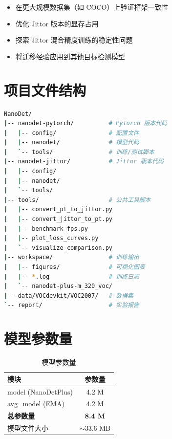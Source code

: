 \documentclass[12pt,a4paper]{article}
\begin{document}
\begin{itemize}
    \item 在更大规模数据集（如 COCO）上验证框架一致性
    \item 优化 Jittor 版本的显存占用
    \item 探索 Jittor 混合精度训练的稳定性问题
    \item 将迁移经验应用到其他目标检测模型
\end{itemize}

\appendix

\section{项目文件结构}

\begin{lstlisting}[language=bash,caption=项目目录结构]
NanoDet/
|-- nanodet-pytorch/          # PyTorch 版本代码
|   |-- config/               # 配置文件
|   |-- nanodet/              # 模型代码
|   `-- tools/                # 训练/测试脚本
|-- nanodet-jittor/           # Jittor 版本代码
|   |-- config/
|   |-- nanodet/
|   `-- tools/
|-- tools/                    # 公共工具脚本
|   |-- convert_pt_to_jittor.py
|   |-- convert_jittor_to_pt.py
|   |-- benchmark_fps.py
|   |-- plot_loss_curves.py
|   `-- visualize_comparison.py
|-- workspace/                # 训练输出
|   |-- figures/              # 可视化图表
|   |-- *.log                 # 训练日志
|   `-- nanodet-plus-m_320_voc/
|-- data/VOCdevkit/VOC2007/   # 数据集
`-- report/                   # 实验报告
\end{lstlisting}

\section{模型参数量}

\begin{table}[H]
\centering
\caption{模型参数量}
\begin{tabular}{lc}
\toprule
\textbf{模块} & \textbf{参数量} \\
\midrule
model (NanoDetPlus) & 4.2 M \\
avg\_model (EMA) & 4.2 M \\
\textbf{总参数量} & \textbf{8.4 M} \\
模型文件大小 & $\sim$33.6 MB \\
\bottomrule
\end{tabular}
\end{table}
\end{document}
